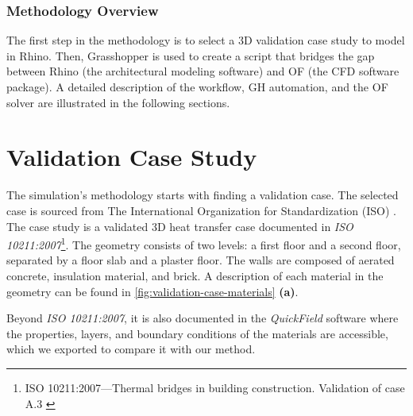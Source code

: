 \subsubsection{Methodology Overview}
The first step in the methodology is to select a 3D validation case study to model in Rhino. Then, Grasshopper is used to create a script that bridges the gap between Rhino (the architectural modeling software) and  \gls{OF} (the CFD software package). A detailed description of the workflow, \gls{GH} automation, and the \gls{OF} solver are illustrated in the following sections.





\section{Validation Case Study}
The simulation's methodology starts with finding a validation case. The selected case is sourced from The International Organization for Standardization (ISO) \cite{ISO}. The case study is a validated 3D heat transfer case documented in \textit{ISO 10211:2007}\footnote{ISO 10211:2007---Thermal bridges in building construction. Validation of case A.3 \cite{ISO}}. 
The geometry consists of two levels: a first floor and a second floor, separated by a floor slab and a plaster floor. The walls are composed of aerated concrete, insulation material, and brick.
A description of each material in the geometry can be found in \ref{fig:validation-case-materials} \textbf{(a)}.

Beyond \textit{ISO 10211:2007}, it is also documented in the \textit{QuickField} software where the properties, layers, and boundary conditions of the materials are accessible, which we exported to compare it with our method. 

   


